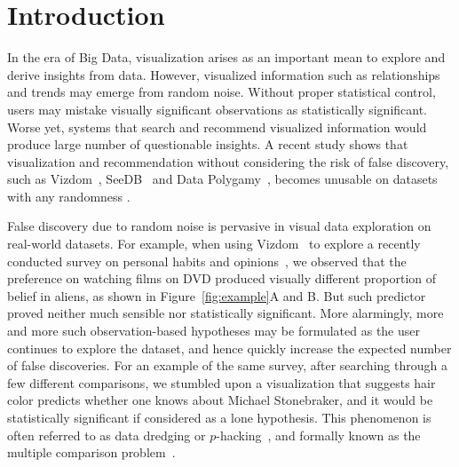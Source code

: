 \section{Introduction}
\label{sec:intro}
 In the era of Big Data, visualization arises as an important mean to explore and derive insights from data.  However, visualized information such as relationships and trends may emerge from random noise.  Without proper statistical control, users may mistake visually significant observations as statistically significant.  Worse yet, systems that search and recommend visualized information would produce large number of questionable insights.  
A recent study shows that visualization and recommendation without considering the risk of false discovery, such as Vizdom~\cite{vizdom}, SeeDB~\cite{seedb} and Data Polygamy~\cite{polygamy}, becomes unusable on datasets with any randomness \cite{binnig2017sustainable}.

False discovery due to random noise is pervasive in visual data exploration on real-world datasets. For example, when using Vizdom~\cite{vizdom} to explore a recently conducted survey on personal habits and opinions~\cite{binnig2017sustainable}, we observed that the preference on watching films on DVD produced visually different proportion of belief in aliens, as shown in Figure~\ref{fig:example}A and B.  But such predictor proved neither much sensible nor statistically significant.  More alarmingly, more and more such observation-based hypotheses may be formulated as the user continues to explore the dataset, and hence quickly increase the expected number of false discoveries. For an example of the same survey, after searching through a few different comparisons, we stumbled upon a visualization that suggests hair color predicts whether one knows about Michael Stonebraker, and it would be statistically significant if considered as a lone hypothesis. This phenomenon is often referred to as data dredging or $p$-hacking~\cite{head2015extent}, and formally known as the multiple comparison problem~\cite{shaffer1995multiple}.

